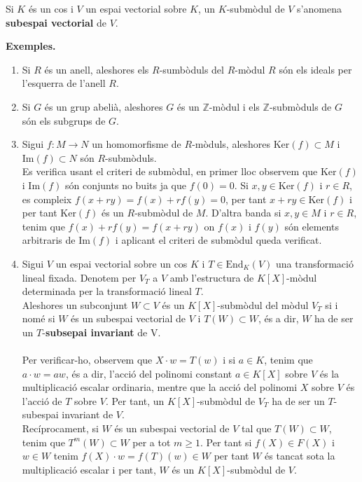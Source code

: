 \begin{definition} Si $K$ és un cos i $V$ un espai vectorial sobre $K$, un $K$-submòdul de $V$ s'anomena \textbf{subespai vectorial} de $V$.
\end{definition}
\textbf{Exemples.}
\begin{enumerate}[(1)]
\item Si $R$ és un anell, aleshores els $R$-sumbòduls del $R$-mòdul $R$ són els ideals per l'esquerra de l'anell $R$.
\item Si $G$ és un grup abelià, aleshores $G$ és un $\mathbb{Z}$-mòdul i els $\mathbb{Z}$-submòduls de $G$ són els subgrups de $G$.
\item Sigui $f:M\rightarrow N$ un homomorfisme de $R$-mòduls, aleshores $\text{Ker}(f)\subset M$ i $\text{Im}(f)\subset N$ són $R$-submòduls. \\
Es verifica usant el criteri de submòdul, en primer lloc observem que $\text{Ker}(f)$ i $\text{Im}(f)$ són conjunts no buits ja que $f(0)=0$. Si $x,y\in \text{Ker}(f)$ i $r\in R$, es compleix $f(x+ry)=f(x)+rf(y)=0$, per tant $x+ry\in \text{Ker}(f)$ i per tant $\text{Ker}(f)$ és un $R$-submòdul de $M$. D'altra banda si $x,y\in M$ i $r\in R$, tenim que $f(x)+rf(y)=f(x+ry)$ on $f(x)$ i $f(y)$ són elements arbitraris de $\text{Im}(f)$ i aplicant el criteri de submòdul queda verificat.
\item Sigui $V$ un espai vectorial sobre un cos $K$ i $T\in \text{End}_K(V)$ una transformació lineal fixada. Denotem per $V_T$ a $V$ amb l'estructura de $K[X]$-mòdul determinada per la transformació lineal $T$.\\
Aleshores un subconjunt $W\subset V$ és un $K[X]$-submòdul del mòdul $V_T$ si i nomé si $W$ és un subespai vectorial de $V$ i $T(W)\subset W$, és a dir, $W$ ha de ser un $T$-\textbf{subsepai invariant} de V. \\ \\
Per verificar-ho, observem que $X\cdot w = T(w)$ i si $a\in K$, tenim que $a\cdot w =aw$, és a dir, l'acció del polinomi constant $a\in K[X]$ sobre $V$ és la multiplicació escalar ordinaria, mentre que la acció del polinomi $X$ sobre $V$ és l'acció de $T$ sobre $V$. Per tant, un $K[X]$-submòdul de $V_T$ ha de ser un $T$-subespai invariant de $V$. \\
Recíprocament, si $W$ és un subespai vectorial de $V$ tal que $T(W)\subset W$, tenim que $T^{m}(W)\subset W$ per a tot $m\geq 1$. Per tant si $f(X)\in F(X)$ i $w\in W$ tenim $f(X)\cdot w=f(T)(w)\in W$ per tant $W$ és tancat sota la multiplicació escalar i per tant, $W$ és un $K[X]$-submòdul de $V$.
\end{enumerate}

